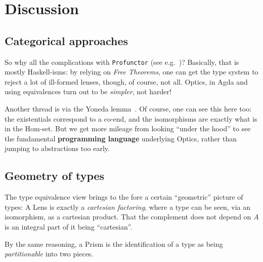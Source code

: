 \documentclass[sigplan,review,anonymous]{acmart}
\begin{document}
\section{Discussion}

\subsection{Categorical approaches}

So why all the complications with \texttt{Profunctor} (see
e.g.~\cite{achromatic})? Basically, that is mostly Haskell-isms: by
relying on \emph{Free Theorems}, one can get the type system to reject
a lot of ill-formed lenses, though, of course, not all. Optics, in
Agda and using equivalences turn out to be \emph{simpler}, not harder!

Another thread is via the Yoneda
lemma~\cite{Boisseau:2018:YNK:3243631.3236779}. Of course, one can see
this here too: the existentials correspond to a co-end, and the
isomorphisms are exactly what is in the Hom-set. But we get more
mileage from looking ``under the hood'' to see the fundamental
\textbf{programming language} underlying Optics, rather than jumping
to abstractions too early.

\begin{comment}
\subsection{Laws}

Why do lenses have 3 laws but equivalences have two?  Because the functions that
make up lenses have 3 laws --- the products have $\eta$. And the proof of putput uses it.
Why do prisms have 2 laws then? This remains unclear.

Why do some bidirectional programming eschew the putput law? In part, this seems due
to
\end{comment}

\subsection{Geometry of types}

The type equivalence view brings to the fore a certain ``geometric''
picture of types: A Lens is exactly a \emph{cartesian factoring},
where a type can be seen, via an isomorphism, as a cartesian product.
That the complement does not depend on $A$ is an integral part of
it being ``cartesian''.

By the same reasoning, a Prism is the identification of a type as
being \emph{partitionable} into two pieces.
\end{document}
